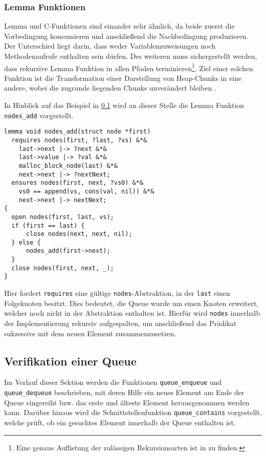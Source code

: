 \subsubsection{Lemma Funktionen}
\label{subsubsec:lemma}

Lemma und C-Funktionen sind einander sehr ähnlich, da beide zuerst die Vorbedingung konsumieren und anschließend die Nachbedingung produzieren. Der Unterschied liegt darin, dass weder Variablenzuweisungen noch Methodenaufrufe enthalten sein dürfen. Des weiteren muss sichergestellt werden, dass rekursive Lemma Funktion in allen Pfaden terminieren\footnote{Eine genaue Auflistung der zulässigen Rekursionsarten ist in \cite[S. 22]{Jacobs2017} zu finden.}. Ziel einer solchen Funktion ist die Transformation einer Darstellung von Heap-Chunks in eine andere, wobei die zugrunde liegenden Chunks unverändert bleiben \cite{Jacobs2010}.

In Hinblick auf das Beispiel in \cref{subsec:queue} wird an dieser Stelle die Lemma Funktion \texttt{nodes\_add} vorgestellt.

\begin{lstlisting}
lemma void nodes_add(struct node *first)
  requires nodes(first, ?last, ?vs) &*&
    last->next |-> ?next &*&
    last->value |-> ?val &*&
    malloc_block_node(last) &*&
    next->next |-> ?nextNext;
  ensures nodes(first, next, ?vs0) &*&
    vs0 == append(vs, cons(val, nil)) &*&
    next->next |-> nextNext;
{
  open nodes(first, last, vs);
  if (first == last) {
      close nodes(next, next, nil);
  } else {
      nodes_add(first->next);
  }
  close nodes(first, next, _);
}
\end{lstlisting}

\noindent
Hier fordert \texttt{requires} eine gültige \texttt{nodes}-Abstraktion, in der \texttt{last} einen Folgeknoten besitzt. Dies bedeutet, die Queue wurde um einen Knoten erweitert, welcher noch nicht in der Abstraktion enthalten ist. Hierfür wird \texttt{nodes} innerhalb der Implementierung rekursiv aufgespalten, um anschließend das Prädikat sukzessive mit dem neuen Element zusammenzusetzen.

\subsection{Verifikation einer Queue}
\label{subsec:queue}

Im Verlauf dieser Sektion werden die Funktionen \texttt{queue\_enqueue} und \texttt{queue\_dequeue} beschrieben, mit deren Hilfe ein neues Element am Ende der Queue eingereiht bzw. das erste und älteste Element herausgenommen werden kann. Darüber hinaus wird die Schnittstellenfunktion \texttt{queue\_contains} vorgestellt, welche prüft, ob ein gesuchtes Element innerhalb der Queue enthalten ist.

